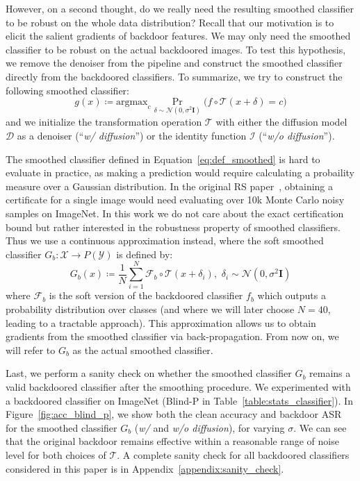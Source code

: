 \documentclass[10pt,twocolumn,letterpaper]{article}
\newcommand{\br}[1]{\left({#1}\right)}
\begin{document}
However, on a second thought, do we really need the resulting smoothed classifier to be robust on the whole data distribution? Recall that our motivation is to elicit the salient gradients of backdoor features. We may only need the smoothed classifier to be robust on the actual backdoored images. To test this hypothesis, we remove the denoiser from the pipeline and construct the smoothed classifier directly from the backdoored classifiers. To summarize, we try to construct the following smoothed classifier:
\begin{equation}\label{eq:def_smoothed}
    g(x)\coloneqq \text{argmax}_{c}\Pr_{\delta \sim \mathcal{N}\br{0, \sigma^2 \mathbf{I}}}\big(f\circ \mathcal{T}(x + \delta) = c\big)
\end{equation}
and we initialize the transformation operation $\mathcal{T}$ with either the diffusion model $\mathcal{D}$ as a denoiser (``\textit{w/ diffusion}'') or the identity function $\mathcal{I}$ (``\textit{w/o diffusion}''). 



  The smoothed classifier defined in Equation~\ref{eq:def_smoothed} is hard to evaluate in practice, as making a prediction would require calculating a probaility measure over a Gaussian distribution. In the original RS paper~\cite{cohen2019certified}, obtaining a certificate for a single image would need evaluating over 10k Monte Carlo noisy samples on ImageNet. In this work we do not care about the exact certification bound but rather interested in the robustness property of smoothed classifiers. Thus we use a continuous approximation instead, where the soft smoothed classifier $G_{b}:\mathcal{X}\rightarrow P(\mathcal{Y})$ is defined by:
\begin{equation}\label{eq:soft_dds}
    G_{b}(x)\coloneqq  \frac{1}{N}\sum_{i=1}^{N} \mathcal{F}_{b}\circ \mathcal{T}(x+\delta_{i}),\,\, \delta_{i} \sim \mathcal{N}\br{0, \sigma^2 \mathbf{I}}
\end{equation}
where $\mathcal{F}_{b}$ is the soft version of the backdoored classifier $f_{b}$ which outputs a probability distribution over classes (and where we will later choose $N=40$, leading to a tractable approach). This approximation allows us to obtain gradients from the smoothed classifier via back-propagation. From now on, we will refer to $G_{b}$ as the actual smoothed classifier.




Last, we perform a sanity check on whether the smoothed classifier $G_{b}$ remains a valid backdoored classifier after the smoothing procedure. We experimented with a backdoored classifier on ImageNet (Blind-P in Table~\ref{table:stats_classifier}). In Figure~\ref{fig:acc_blind_p}, we show both the clean accuracy and backdoor ASR for the smoothed classifier $G_{b}$ (\textit{w/} and \textit{w/o diffusion}), for varying $\sigma$. We can see that the original backdoor remains effective within a reasonable range of noise level for both choices of $\mathcal{T}$. A complete sanity check for all backdoored classifiers considered in this paper is in Appendix~\ref{appendix:sanity_check}.
\end{document}
